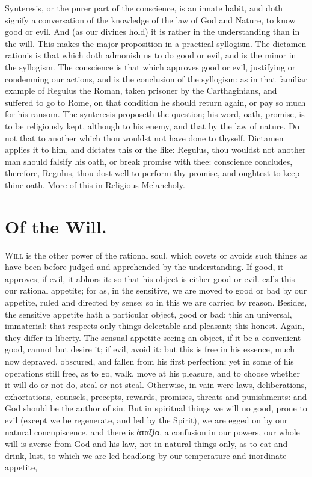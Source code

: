 {Synteresis, or the purer part of the conscience, is an innate habit,
and doth signify a conversation of the knowledge of the law of God and
Nature, to know good or evil. And (as our divines hold) it is rather in
the understanding than in the will. This makes the major proposition in
a practical syllogism. The dictamen rationis is that which doth
admonish us to do good or evil, and is the minor in the syllogism. The
conscience is that which approves good or evil, justifying or
condemning our actions, and is the conclusion of the syllogism: as in
that familiar example of Regulus the Roman, taken prisoner by the
Carthaginians, and suffered to go to Rome, on that condition he should
return again, or pay so much for his ransom. The synteresis proposeth
the question; his word, oath, promise, is to be religiously kept,
although to his enemy, and that by the law of nature. Do not that
to another which thou wouldst not have done to thyself. Dictamen
applies it to him, and dictates this or the like: Regulus, thou wouldst
not another man should falsify his oath, or break promise with thee:
conscience concludes, therefore, Regulus, thou dost well to perform thy
promise, and oughtest to keep thine oath. More of this in \hyperref[ch:religious-melancholy]{Religious
Melancholy}.

\section{Of the Will.}

\lettrine{W}{ill} is the other power of the rational soul, which covets or
avoids such things as have been before judged and apprehended by the
understanding. If good, it approves; if evil, it abhors it: so that his
object is either good or evil. \Aristotle calls this our rational
appetite; for as, in the sensitive, we are moved to good or bad by our
appetite, ruled and directed by sense; so in this we are carried by
reason. Besides, the sensitive appetite hath a particular object, good
or bad; this an universal, immaterial: that respects only things
delectable and pleasant; this honest. Again, they differ in liberty.
The sensual appetite seeing an object, if it be a convenient good,
cannot but desire it; if evil, avoid it: but this is free in his
essence, much now depraved, obscured, and fallen from his first
perfection; yet in some of his operations still free, as to go, walk,
move at his pleasure, and to choose whether it will do or not do, steal
or not steal. Otherwise, in vain were laws, deliberations,
exhortations, counsels, precepts, rewards, promises, threats and
punishments: and God should be the author of sin. But in 
spiritual things we will no good, prone to evil (except we be
regenerate, and led by the Spirit), we are egged on by our natural
concupiscence, and there is \textgreek{ἀταξία}, a confusion in our powers,
our whole will is averse from God and his law, not in natural
things only, as to eat and drink, lust, to which we are led headlong by
our temperature and inordinate appetite,

}
